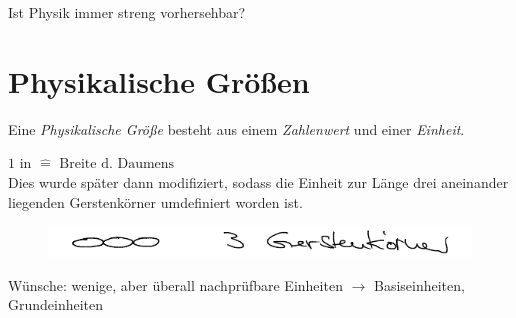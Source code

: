 \documentclass[a4paper,10pt]{scrartcl}
\begin{document}
\begin{seg}{Ist Physik immer streng vorhersehbar?}
\section{Physikalische Größen}
Eine \emph{Physikalische Größe} besteht aus einem \emph{Zahlenwert} und einer \emph{Einheit}.
\begin{ex*}
$1 \text{ in } \hat = \text{ Breite d. Daumens}$\\
Dies wurde später dann modifiziert, sodass die Einheit zur Länge drei aneinander liegenden Gerstenkörner umdefiniert worden ist.
\begin{figure}[h]
\includegraphics[scale=0.5]{fig4.png}
 \end{figure}
 
 Wünsche: wenige, aber überall nachprüfbare Einheiten $\rightarrow$ Basiseinheiten, Grundeinheiten
 \end{ex*}
 \end{seg}
\end{document}
